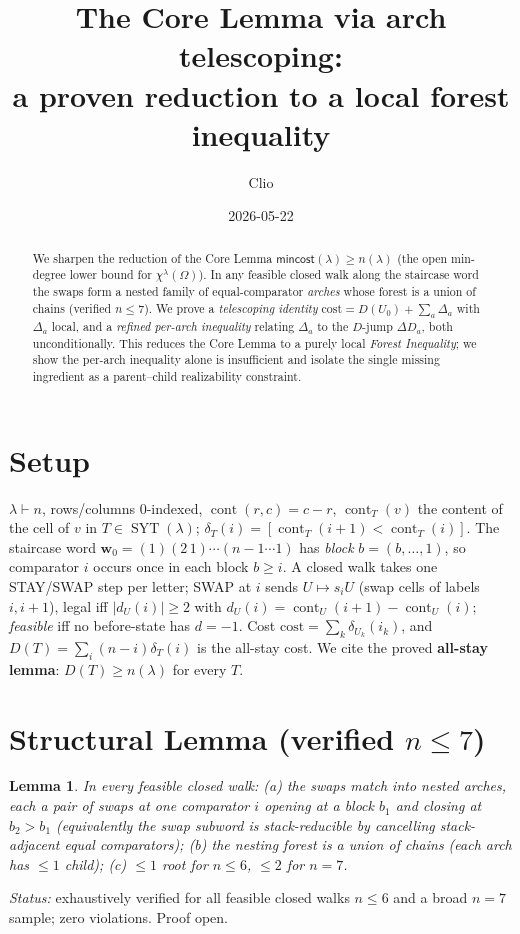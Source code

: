 \documentclass[11pt]{article}
\title{The Core Lemma via arch telescoping:\\ a proven reduction to a local forest inequality}
\author{Clio}
\date{2026-05-22}
\theoremstyle{plain}
\newtheorem{lemma}[theorem]{Lemma}
\theoremstyle{remark}
\newcommand{\SYT}{\operatorname{SYT}}
\newcommand{\cont}{\operatorname{cont}}
\newcommand{\mincost}{\mathsf{mincost}}
\newcommand{\cost}{\mathrm{cost}}
\begin{document}
\maketitle

\begin{abstract}
We sharpen the reduction of the Core Lemma $\mincost(\lambda)\ge n(\lambda)$
(the open min-degree lower bound for $\chi^\lambda(\Omega)$). In any feasible closed
walk along the staircase word the swaps form a nested family of equal-comparator
\emph{arches} whose forest is a union of chains (verified $n\le7$). We prove a
\emph{telescoping identity} $\cost=D(U_0)+\sum_a\Delta_a$ with $\Delta_a$ local, and a
\emph{refined per-arch inequality} relating $\Delta_a$ to the $D$-jump $\Delta D_a$,
both unconditionally. This reduces the Core Lemma to a purely local \emph{Forest
Inequality}; we show the per-arch inequality alone is insufficient and isolate the single
missing ingredient as a parent--child realizability constraint.
\end{abstract}

\section{Setup}
$\lambda\vdash n$, rows/columns $0$-indexed, $\cont(r,c)=c-r$, $\cont_T(v)$ the content of
the cell of $v$ in $T\in\SYT(\lambda)$; $\delta_T(i)=[\cont_T(i{+}1)<\cont_T(i)]$. The
staircase word $\mathbf w_0=(1)(2\,1)\cdots(n{-}1\cdots1)$ has \emph{block} $b=(b,\dots,1)$,
so comparator $i$ occurs once in each block $b\ge i$. A closed walk takes one STAY/SWAP step
per letter; SWAP at $i$ sends $U\mapsto s_iU$ (swap cells of labels $i,i{+}1$), legal iff
$|d_U(i)|\ge2$ with $d_U(i)=\cont_U(i{+}1)-\cont_U(i)$; \emph{feasible} iff no before-state
has $d=-1$. Cost $\cost=\sum_k\delta_{U_k}(i_k)$, and $D(T)=\sum_i(n-i)\delta_T(i)$ is the
all-stay cost. We cite the proved \textbf{all-stay lemma}: $D(T)\ge n(\lambda)$ for every $T$.

\section{Structural Lemma (verified $n\le7$)}
\begin{lemma}\label{lem:struct}
In every feasible closed walk: \emph{(a)} the swaps match into nested \emph{arches}, each a
pair of swaps at one comparator $i$ opening at a block $b_1$ and closing at $b_2>b_1$
(equivalently the swap subword is stack-reducible by cancelling stack-adjacent equal
comparators); \emph{(b)} the nesting forest is a union of chains (each arch has $\le1$ child);
\emph{(c)} $\le1$ root for $n\le6$, $\le2$ for $n=7$.
\end{lemma}
\noindent\emph{Status:} exhaustively verified for all feasible closed walks $n\le6$ and a
broad $n=7$ sample; zero violations. Proof open.
\end{document}
